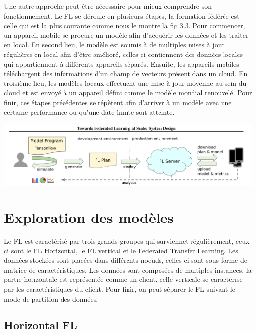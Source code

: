 \documentclass[12pt,a4paper]{report}
\begin{document}
\pagebreak

Une autre approche peut être nécessaire pour mieux comprendre son fonctionnement. Le FL se déroule en plusieurs étapes, la formation fédérée est celle qui est la plus courante comme nous le montre la fig 3.3. Pour commencer, un appareil mobile se procure un modèle afin d'acquérir les données et les traiter en local. En second lieu, le modèle est soumis à de multiples mises à jour régulières en local afin d'être amélioré, celles-ci contiennent des données locales qui appartiennent à différents appareils séparés. Ensuite, les appareils mobiles téléchargent des informations d'un champ de vecteurs présent dans un cloud. En troisième lieu, les modèles locaux effectuent une mise à jour moyenne au sein du cloud et est envoyé à un appareil défini comme le modèle mondial renouvelé. Pour finir, ces étapes précédentes se répètent afin d'arriver à un modèle avec une certaine performance ou qu'une date limite soit atteinte.

\begin{center}
	\includegraphics[scale=0.3]{mobile_schema_fl}
	\label{fig1}
\end{center}

\section{Exploration des modèles}

Le FL est caractérisé par trois grands groupes qui surviennet régulièrement, ceux ci sont le FL Horizontal, le FL vertical et le Federated Transfer Learning. Les données stockées sont placées dans différents noeuds, celles ci sont sous forme de matrice de caractéristiques. Les données sont composées de multiples instances, la partie horizontale est représentée comme un client, celle verticale se caractérise par les caractéristiques du client. Pour finir, on peut séparer le FL suivant le mode de partition des données.\\

\subsection{Horizontal FL}
\end{document}
